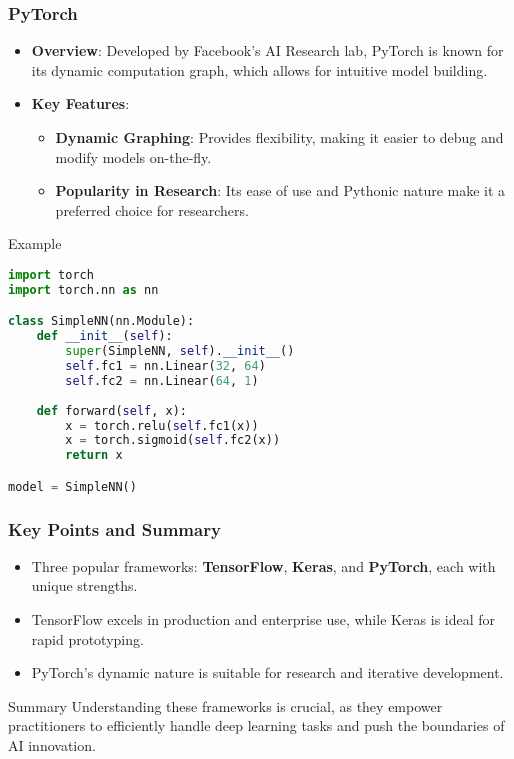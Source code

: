 \documentclass[aspectratio=169]{beamer}
\begin{document}
\begin{frame}[fragile]
  \frametitle{PyTorch}
  \begin{itemize}
    \item \textbf{Overview}: Developed by Facebook's AI Research lab, PyTorch is known for its dynamic computation graph, which allows for intuitive model building.
    \item \textbf{Key Features}:
      \begin{itemize}
        \item \textbf{Dynamic Graphing}: Provides flexibility, making it easier to debug and modify models on-the-fly.
        \item \textbf{Popularity in Research}: Its ease of use and Pythonic nature make it a preferred choice for researchers.
      \end{itemize}
  \end{itemize}

  \begin{block}{Example}
    \begin{lstlisting}[language=Python]
import torch
import torch.nn as nn

class SimpleNN(nn.Module):
    def __init__(self):
        super(SimpleNN, self).__init__()
        self.fc1 = nn.Linear(32, 64)
        self.fc2 = nn.Linear(64, 1)
        
    def forward(self, x):
        x = torch.relu(self.fc1(x))
        x = torch.sigmoid(self.fc2(x))
        return x

model = SimpleNN()
    \end{lstlisting}
  \end{block}
\end{frame}

\begin{frame}
  \frametitle{Key Points and Summary}
  \begin{itemize}
    \item Three popular frameworks: \textbf{TensorFlow}, \textbf{Keras}, and \textbf{PyTorch}, each with unique strengths.
    \item TensorFlow excels in production and enterprise use, while Keras is ideal for rapid prototyping.
    \item PyTorch's dynamic nature is suitable for research and iterative development.
  \end{itemize}

  \begin{block}{Summary}
    Understanding these frameworks is crucial, as they empower practitioners to efficiently handle deep learning tasks and push the boundaries of AI innovation.
  \end{block}
\end{frame}
\end{document}
